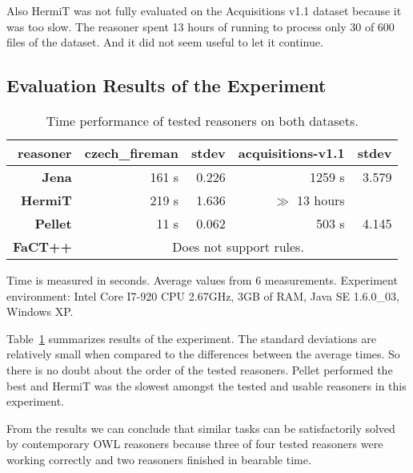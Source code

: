 Also HermiT was not fully evaluated on the Acquisitions v1.1 dataset because it was too slow. The reasoner spent 13 hours of running to process only 30 of 600 files of the dataset. And it did not seem useful to let it continue.












\subsection{Evaluation Results of the Experiment}






\begin{table}
\begin{center}
\begin{tabular}{|r||r|r||r|r|}
\hline
reasoner & \textbf{czech\_fireman} & stdev & \textbf{acquisitions-v1.1} & stdev\\
\hline
\hline
\textbf{Jena} & 161 s & 0.226 & 1259 s & 3.579\\
\hline
\textbf{HermiT} & 219 s & 1.636 & $\gg$ 13 hours & \\
\hline
\textbf{Pellet} & 11 s & 0.062 & 503 s & 4.145\\
\hline
\textbf{FaCT++} & \multicolumn{4}{|c|}{Does not support rules.}\\
\hline
\end{tabular}
\end{center}

Time is measured in seconds. Average values from 6 measurements. Experiment environment: Intel Core I7-920 CPU 2.67GHz, 3GB of RAM, Java SE 1.6.0\_03, Windows XP.

\caption{Time performance of tested reasoners on both datasets.}
\label{tab:results}
\end{table}

Table~\ref{tab:results} summarizes results of the experiment. The standard deviations are relatively small when compared to the differences between the average times.  So there is no doubt about the order of the tested reasoners. Pellet performed the best and HermiT was the slowest amongst the tested and usable reasoners in this experiment.

From the results we can conclude that similar tasks can be satisfactorily solved by contemporary OWL reasoners because three of four tested reasoners were working correctly and two reasoners finished in bearable time.

